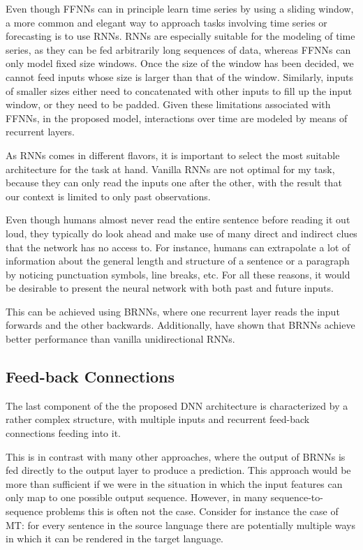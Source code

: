 Even though \acp{FFNN} can in principle learn time series by using a sliding window, a more common and elegant way to approach tasks involving time series or forecasting is to use \acp{RNN}.
\acp{RNN} are especially suitable for the modeling of time series, as they can be fed arbitrarily long sequences of data, whereas \acp{FFNN} can only model fixed size windows.
Once the size of the window has been decided, we cannot feed inputs whose size is larger than that of the window.
Similarly, inputs of smaller sizes either need to concatenated with other inputs to fill up the input window, or they need to be padded.
Given these limitations associated with \acp{FFNN}, in the proposed model, interactions over time are modeled by means of recurrent layers.

As \acp{RNN} comes in different flavors, it is important to select the most suitable architecture for the task at hand.
Vanilla \acp{RNN} are not optimal for my task, because they can only read the inputs one after the other, with the result that our context is limited to only past observations. 

Even though humans almost never read the entire sentence before reading it out loud, they typically do look ahead and make use of many direct and indirect clues that the network has no access to. 
For instance, humans can extrapolate a lot of information about the general length and structure of a sentence or a paragraph by noticing punctuation symbols, line breaks, etc. 
For all these reasons, it would be desirable to present the neural network with both past and future inputs. 

This can be achieved using \acp{BRNN}, where one recurrent layer reads the input forwards and the other backwards. 
Additionally, \citet{Schuster1997Bidirectional} have shown that \acp{BRNN} achieve better performance than vanilla unidirectional \acp{RNN}.


\subsection{Feed-back Connections}

The last component of the the proposed \ac{DNN} architecture is characterized by a rather complex structure, with multiple inputs and recurrent feed-back connections feeding into it.

This is in contrast with many other approaches, where the output of \acp{BRNN} is fed directly to the output layer to produce a prediction.
This approach would be more than sufficient if we were in the situation in which the input features can only map to one possible output sequence. 
However, in many sequence-to-sequence problems this is often not the case.
Consider for instance the case of \ac{MT}: for every sentence in the source language there are potentially multiple ways in which it can be rendered in the target language.

